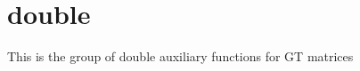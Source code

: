 \hypertarget{group__doubleGTauxiliary}{}\section{double}
\label{group__doubleGTauxiliary}
This is the group of double auxiliary functions for G\+T matrices 